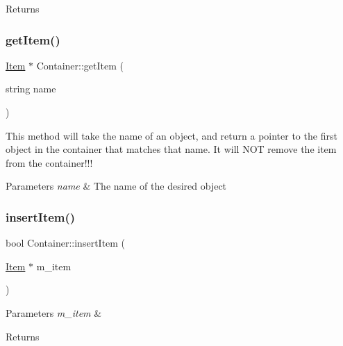\begin{DoxyReturn}{Returns}

\end{DoxyReturn}
\hypertarget{class_container_a0a7c5bb0533b6a28ae6b5f0736d75d30}{}\label{class_container_a0a7c5bb0533b6a28ae6b5f0736d75d30} 
\subsubsection{\texorpdfstring{get\+Item()}{getItem()}}
{\footnotesize\ttfamily \hyperlink{class_item}{Item} $\ast$ Container\+::get\+Item (\begin{DoxyParamCaption}\item[{string}]{name }\end{DoxyParamCaption})}



This method will take the name of an object, and return a pointer to the first object in the container that matches that name. It will N\+OT remove the item from the container!!! 


\begin{DoxyParams}{Parameters}
{\em name} & The name of the desired object \\
\hline
\end{DoxyParams}
\hypertarget{class_container_a512e6e65360249dc2fcd1aa5f466a01e}{}\label{class_container_a512e6e65360249dc2fcd1aa5f466a01e} 
\subsubsection{\texorpdfstring{insert\+Item()}{insertItem()}}
{\footnotesize\ttfamily bool Container\+::insert\+Item (\begin{DoxyParamCaption}\item[{\hyperlink{class_item}{Item} $\ast$}]{m\+\_\+item }\end{DoxyParamCaption})}


\begin{DoxyParams}{Parameters}
{\em m\+\_\+item} & \\
\hline
\end{DoxyParams}
\begin{DoxyReturn}{Returns}

\end{DoxyReturn}
\hypertarget{class_container_a8b203900fe9babebd7e744e34321962c}{}\label{class_container_a8b203900fe9babebd7e744e34321962c} 

